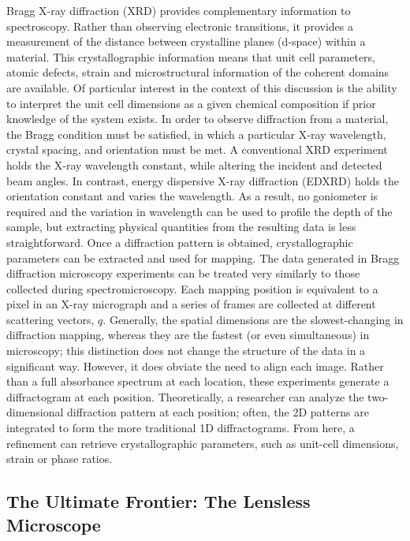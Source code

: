 \documentclass[journal=cmatex,manuscript=perspective]{achemso}
\begin{document}
Bragg X-ray diffraction (XRD) provides complementary information to
spectroscopy. Rather than observing electronic transitions, it
provides a measurement of the distance between crystalline planes
(d-space) within a material. This crystallographic information means
that unit cell parameters, atomic defects, strain and microstructural
information of the coherent domains are available. Of particular
interest in the context of this discussion is the ability to interpret
the unit cell dimensions as a given chemical composition if prior
knowledge of the system exists. In order to observe diffraction from a
material, the Bragg condition must be satisfied, in which a particular
X-ray wavelength, crystal spacing, and orientation must be met. A
conventional XRD experiment holds the X-ray wavelength constant, while
altering the incident and detected beam angles. In contrast, energy
dispersive X-ray diffraction (EDXRD) holds the orientation constant
and varies the wavelength. As a result, no goniometer is required and
the variation in wavelength can be used to profile the depth of the
sample, but extracting physical quantities from the resulting data is
less straightforward\cite{michel2005,strobridge2015}. Once a
diffraction pattern is obtained, crystallographic parameters can be
extracted and used for mapping. The data generated in Bragg
diffraction microscopy experiments can be treated very similarly to
those collected during spectromicroscopy. Each mapping position is
equivalent to a pixel in an X-ray micrograph and a series of frames
are collected at different scattering vectors, $q$. Generally, the
spatial dimensions are the slowest-changing in diffraction mapping,
whereas they are the fastest (or even simultaneous) in microscopy;
this distinction does not change the structure of the data in a
significant way. However, it does obviate the need to align each
image. Rather than a full absorbance spectrum at each location, these
experiments generate a diffractogram at each position. Theoretically,
a researcher can analyze the two-dimensional diffraction pattern at
each position; often, the 2D patterns are integrated to form the more
traditional 1D diffractograms. From here, a refinement can retrieve
crystallographic parameters, such as unit-cell dimensions, strain or
phase ratios.

\subsection{The Ultimate Frontier: The Lensless Microscope}
\end{document}
